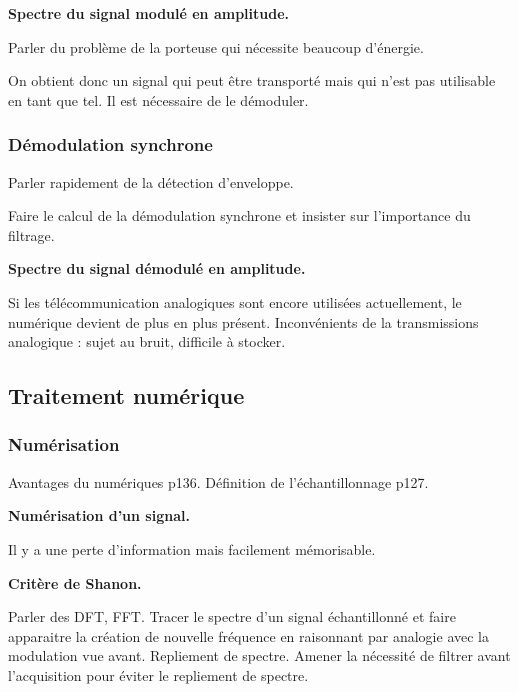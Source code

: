 \begin{slide}
\textbf{Spectre du signal modulé en amplitude.}
\end{slide}

Parler du problème de la porteuse qui nécessite beaucoup d'énergie.

\begin{transition}
On obtient donc un signal qui peut être transporté mais qui n'est pas utilisable en tant que tel.
Il est nécessaire de le démoduler.
\end{transition}

\subsubsection{Démodulation synchrone}

Parler rapidement de la détection d'enveloppe.

Faire le calcul de la démodulation synchrone et insister sur l'importance du filtrage.
 
\begin{slide}
\textbf{Spectre du signal démodulé en amplitude.}
\end{slide}

\begin{transition}
Si les télécommunication analogiques sont encore utilisées actuellement, le numérique devient de plus en plus présent.
Inconvénients de la transmissions analogique : sujet au bruit, difficile à stocker.
\end{transition}

\subsection{Traitement numérique}

\subsubsection{Numérisation}

Avantages du numériques \cite{Cardini2017} p136.
Définition de l'échantillonnage \cite{Cardini2017} p127.

\begin{slide}
\textbf{Numérisation d'un signal.}
\end{slide}

Il y a une perte d'information mais facilement mémorisable.

\begin{slide}
\textbf{Critère de Shanon.}
\end{slide}
Parler des DFT, FFT.
Tracer le spectre d'un signal échantillonné et faire apparaitre la création de nouvelle fréquence en raisonnant par analogie avec la modulation vue avant.
Repliement de spectre.
Amener la nécessité de filtrer avant l'acquisition pour éviter le repliement de spectre.

